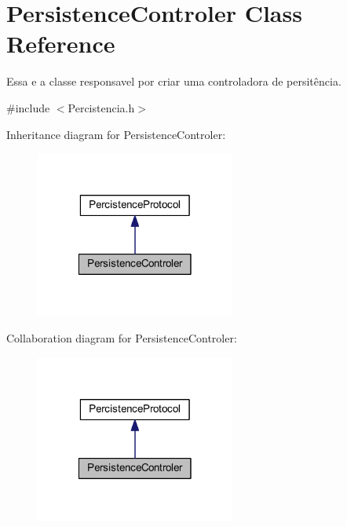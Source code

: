 \hypertarget{class_persistence_controler}{\section{Persistence\-Controler Class Reference}
\label{class_persistence_controler}
}


Essa e a classe responsavel por criar uma controladora de persitência.  




{\ttfamily \#include $<$Percistencia.\-h$>$}



Inheritance diagram for Persistence\-Controler\-:
\nopagebreak
\begin{figure}[H]
\begin{center}
\leavevmode
\includegraphics[width=186pt]{class_persistence_controler__inherit__graph}
\end{center}
\end{figure}


Collaboration diagram for Persistence\-Controler\-:
\nopagebreak
\begin{figure}[H]
\begin{center}
\leavevmode
\includegraphics[width=186pt]{class_persistence_controler__coll__graph}
\end{center}
\end{figure}
